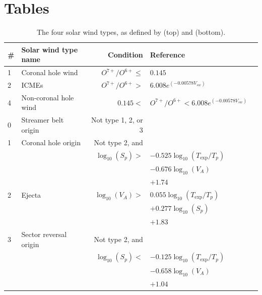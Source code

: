 \documentclass[utf8]{frontiersSCNS} %
\begin{document}



\section*{Tables}

\begin{table}\centering
	\begin{tabular}{@{}llrll@{}}
		\toprule
		\# & Solar wind type name & Condition & Reference \\
		\midrule
		1 & Coronal hole wind & $O^{7+}/O^{6+}\leq$&$0.145$ & \citep{Zhao2009} \\
		2 & ICMEs & $O^{7+}/O^{6+}>$&$6.008e^{(-0.00578V_{sw})}$ & \\
		4 & Non-coronal hole wind & $0.145<$&$ O^{7+}/O^{6+} < 6.008e^{(-0.00578V_{sw})} $ & \\
		\midrule
		0 & Streamer belt origin & Not type 1, 2, or 3 & & \citep{Xu2015b} \\
		1 & Coronal hole origin & Not type 2, and & & \\
		  &  & $\log_{10}(S_p)>$&$ -0.525 \log_{10}(T_{\text{exp}}/T_p)$\\
		  &  & &$- 0.676\log_{10}(V_A)$ \\
		  &  & &$+ 1.74$ & \\
		2 & Ejecta & $\log_{10}(V_A)>$ & $ 0.055\log_{10}(T_{\text{exp}}/T_p)$ \\
		  &  & & $+ 0.277 \log_{10}(S_p)$ \\
		  &  & & $+ 1.83$ & \\
		3 & Sector reversal origin & Not type 2, and & & \\
		  & & $\log_{10}(S_p)<$&$ -0.125 \log_{10}(T_{\text{exp}}/T_p)$ \\
		  & & & $- 0.658\log_{10}(V_A)$ \\
		  & & & $+ 1.04$ &  \\
		\bottomrule
	\end{tabular}
	\caption{The four solar wind types, as defined by \citep{Zhao2009} (top) and \citep{Xu2015b} (bottom).}
	\label{tab:swtypes}
\end{table}
\end{document}
